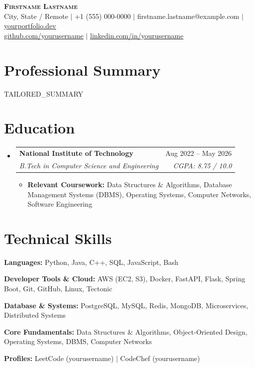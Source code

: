 \documentclass[letterpaper,11pt]{article}
\makeatletter
\newcommand{\resumeItem}[1]{
  \item\small{
    {#1 \vspace{-1pt}}
  }
}
\newcommand{\resumeSubheading}[4]{
  \vspace{-2pt}\item
    \begin{tabularx}{\textwidth}{@{}X r@{}}
      \textbf{#1} & #2 \\
      \textit{\small#3} & \textit{\small #4} \\
    \end{tabularx}\vspace{-6pt}
}
\newcommand{\resumeSubHeadingListStart}{\begin{itemize}[leftmargin=0pt, label={}]\vspace{-2pt}}
\newcommand{\resumeSubHeadingListEnd}{\end{itemize}\vspace{-3pt}}
\newcommand{\resumeItemListStart}{\begin{itemize}[leftmargin=*, itemsep=1.0pt, parsep=0pt]}
\newcommand{\resumeItemListEnd}{\end{itemize}\vspace{-5pt}}
\makeatother
\begin{document}
\begin{center}
    \textbf{\Huge \scshape Firstname Lastname} \\ \vspace{2pt}
    \small City, State / Remote $|$ +1 (555) 000-0000 $|$ firstname.lastname@example.com $|$ \href{https://yourportfolio.dev}{\underline{yourportfolio.dev}} \\ \vspace{1pt}
    \small \href{https://github.com/yourusername}{\underline{github.com/yourusername}} $|$ \href{https://linkedin.com/in/yourusername}{\underline{linkedin.com/in/yourusername}}
\end{center}

\section{Professional Summary}
 \begin{itemize}[leftmargin=0pt, label={}]\vspace{-3pt}
    \small{\item{
     {{TAILORED_SUMMARY}}
    }}
 \end{itemize}\vspace{-3pt}

\section{Education}
  \resumeSubHeadingListStart
    \resumeSubheading
      {National Institute of Technology}{Aug 2022 -- May 2026}
      {B.Tech in Computer Science and Engineering}{CGPA: 8.75 / 10.0}
      \resumeItemListStart
        \resumeItem{\textbf{Relevant Coursework:} Data Structures \& Algorithms, Database Management Systems (DBMS), Operating Systems, Computer Networks, Software Engineering}
      \resumeItemListEnd
  \resumeSubHeadingListEnd

\section{Technical Skills}
 \begin{itemize}[leftmargin=0pt, label={}, itemsep=1.5pt, parsep=0pt]\vspace{-3pt}
    \small{
      \item \textbf{Languages:} Python, Java, C++, SQL, JavaScript, Bash
      \item \textbf{Developer Tools \& Cloud:} AWS (EC2, S3), Docker, FastAPI, Flask, Spring Boot, Git, GitHub, Linux, Tectonic
      \item \textbf{Database \& Systems:} PostgreSQL, MySQL, Redis, MongoDB, Microservices, Distributed Systems
      \item \textbf{Core Fundamentals:} Data Structures \& Algorithms, Object-Oriented Design, Operating Systems, DBMS, Computer Networks
      \item \textbf{Profiles:} LeetCode (yourusername) $|$ CodeChef (yourusername)
    }
 \end{itemize}\vspace{-3pt}
\end{document}
